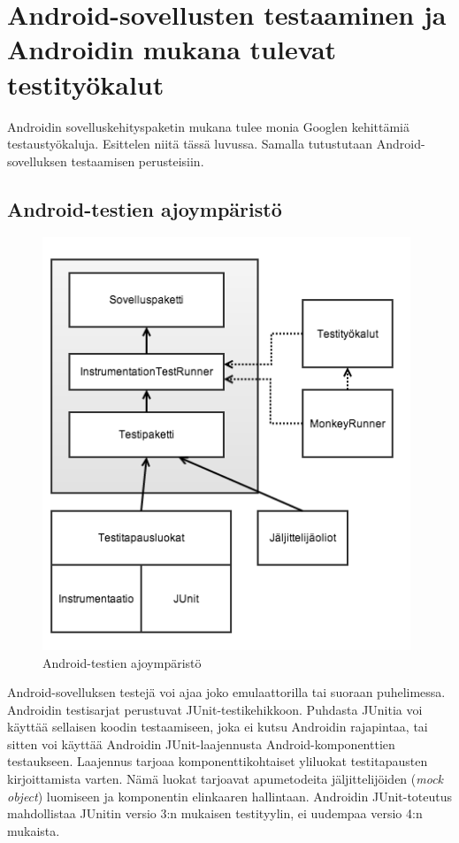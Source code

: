\section{Android-sovellusten testaaminen ja Androidin mukana tulevat testityökalut}

Androidin sovelluskehityspaketin mukana tulee monia Googlen kehittämiä testaustyökaluja. Esittelen niitä tässä luvussa. Samalla tutustutaan Android-sovelluksen testaamisen perusteisiin.

\subsection{Android-testien ajoympäristö}

\begin{figure}[h]
\centering
\includegraphics[width=110mm]{test_framework.png}
\caption{Android-testien ajoympäristö \protect\cite{android_testing}} \label{test_framework}
\end{figure}

Android-sovelluksen testejä voi ajaa joko emulaattorilla tai suoraan puhelimessa. Androidin testisarjat perustuvat JUnit-testikehikkoon. Puhdasta JUnitia voi käyttää sellaisen koodin testaamiseen, joka ei kutsu Androidin rajapintaa, tai sitten voi käyttää Androidin JUnit-laajennusta Android-komponenttien testaukseen. Laajennus tarjoaa komponenttikohtaiset yliluokat testitapausten kirjoittamista varten. Nämä luokat tarjoavat apumetodeita jäljittelijöiden (\emph{mock object}) luomiseen ja komponentin elinkaaren hallintaan. Androidin JUnit-toteutus mahdollistaa JUnitin versio 3:n mukaisen testityylin, ei uudempaa versio 4:n mukaista.

